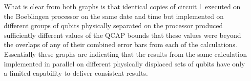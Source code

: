 What is clear from both graphs is that identical copies of circuit 1 executed on the Boeblingen processor on the same date and time but implemented on different groups of qubits physically separated on the processor produced sufficiently different values of the QCAP bounds that these values were beyond the overlaps of any of their combined error bars from each of the calculations.  Essentially these graphs are indicating that the results from the same calculation implemented in parallel on different physically displaced sets of qubits have only a limited capability to deliver consistent results.





